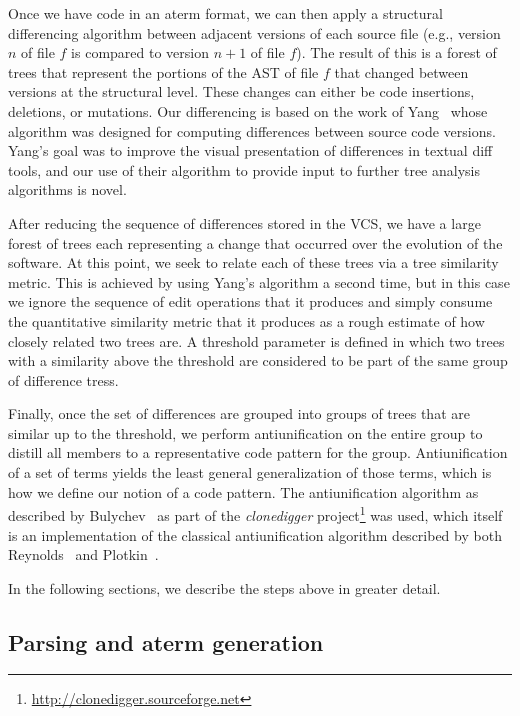 Once we have code in an aterm format, we can then apply a structural
differencing algorithm between adjacent versions of each source file (e.g.,
version $n$ of file $f$ is compared to version $n+1$ of file $f$).  The result
of this is a forest of trees that represent the portions of the AST of file
$f$ that changed between versions at the structural level.  These changes can
either be code insertions, deletions, or mutations.  Our differencing is based
on the work of Yang~\cite{yang91diff} whose algorithm was designed for
computing differences between source code versions.  Yang's goal was to
improve the visual presentation of differences in textual diff tools, and our
use of their algorithm to provide input to further tree analysis algorithms is
novel.

After reducing the sequence of differences stored in the VCS, we have a large
forest of trees each representing a change that occurred over the evolution of
the software.  At this point, we seek to relate each of these trees via a
tree similarity metric.  This is achieved by using Yang's algorithm a second
time, but in this case we ignore the sequence of edit operations that it
produces and simply consume the quantitative similarity metric that it
produces as a rough estimate of how closely related two trees are.  A
threshold parameter is defined in which two trees with a similarity above the
threshold are considered to be part of the same group of difference tress.

Finally, once the set of differences are grouped into groups of trees that are
similar up to the threshold, we perform antiunification on the entire group to
distill all members to a representative code pattern for the group.
Antiunification of a set of terms yields the least general generalization of
those terms, which is how we define our notion of a code pattern.  The
antiunification algorithm as described by Bulychev~\cite{bulychev08dupe} as
part of the {\it clonedigger}
project\footnote{\url{http://clonedigger.sourceforge.net}} was used, which
itself is an implementation of the classical antiunification algorithm
described by both Reynolds~\cite{reynolds70antiunification} and
Plotkin~\cite{plotkin70antiunification}.

In the following sections, we describe the steps above in greater detail.

\subsection{Parsing and aterm generation}

